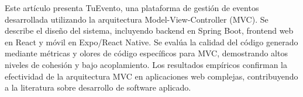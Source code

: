 Este artículo presenta TuEvento, una plataforma de gestión de eventos desarrollada utilizando la arquitectura Model-View-Controller (MVC). Se describe el diseño del sistema, incluyendo backend en Spring Boot, frontend web en React y móvil en Expo/React Native. Se evalúa la calidad del código generado mediante métricas y olores de código específicos para MVC, demostrando altos niveles de cohesión y bajo acoplamiento. Los resultados empíricos confirman la efectividad de la arquitectura MVC en aplicaciones web complejas, contribuyendo a la literatura sobre desarrollo de software aplicado.